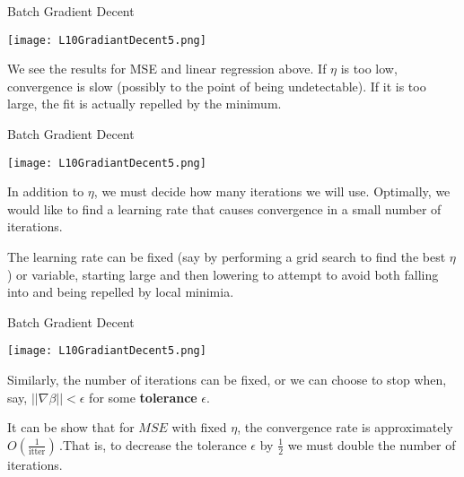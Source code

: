 \documentclass[10pt, table, dvipsnames,xcdraw, handout]{beamer}
\begin{document}
\begin{frame}[fragile]{Batch Gradient Decent}
  \begin{minipage}[t][0.5\textheight][t]{\textwidth}
	\centering \texttt{[image: L10GradiantDecent5.png]} 
  \end{minipage}
  \vfill
\begin{minipage}[t][0.5\textheight][t]{\textwidth}
We see the results for MSE and linear regression above. If $\eta$ is too low, convergence is slow (possibly to the point of being undetectable). \pause If it is too large, the fit is actually repelled by the minimum. 
\end{minipage}
\end{frame}





\begin{frame}[fragile]{Batch Gradient Decent}
  \begin{minipage}[t][0.5\textheight][t]{\textwidth}
	\centering \texttt{[image: L10GradiantDecent5.png]} 
  \end{minipage}
  \vfill
\begin{minipage}[t][0.5\textheight][t]{\textwidth}
In addition to $\eta$, we must decide how many iterations we will use. Optimally, we would like to find a learning rate that causes convergence in a small number of iterations. 

\pause The learning rate can be fixed (say by performing a grid search to find the best $\eta$) or variable, starting large and then lowering to attempt to avoid both falling into and being repelled by local minimia. 
\end{minipage}
\end{frame}




\begin{frame}[fragile]{Batch Gradient Decent}
  \begin{minipage}[t][0.5\textheight][t]{\textwidth}
	\centering \texttt{[image: L10GradiantDecent5.png]} 
  \end{minipage}
  \vfill
\begin{minipage}[t][0.5\textheight][t]{\textwidth}
Similarly, the number of iterations can be fixed, or we can choose to stop when, say, $||\nabla \beta|| <\epsilon$ for some \textbf{tolerance} $\epsilon$. \pause

It can be show that for $MSE$ with fixed $\eta$, the convergence rate is approximately $O\left(\frac{1}{\text{itter}}\right)\,.$\pause That is, to decrease the tolerance $\epsilon$ by $\frac12$ we must double the number of iterations. 
\end{minipage}
\end{frame}
\end{document}
